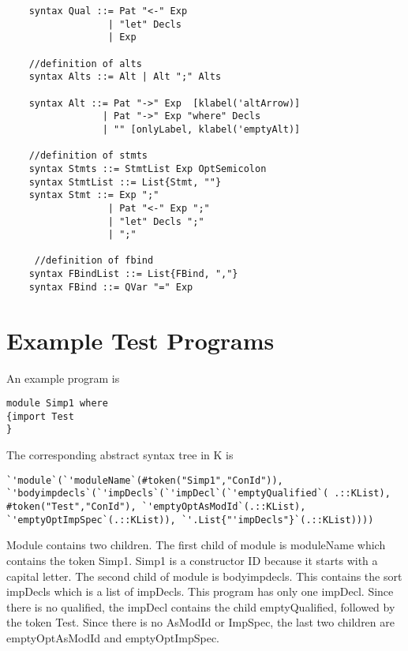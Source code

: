 \begin{lstlisting}
    syntax Qual ::= Pat "<-" Exp
                  | "let" Decls
                  | Exp

    //definition of alts
    syntax Alts ::= Alt | Alt ";" Alts

    syntax Alt ::= Pat "->" Exp  [klabel('altArrow)]
                 | Pat "->" Exp "where" Decls
                 | "" [onlyLabel, klabel('emptyAlt)]

    //definition of stmts
    syntax Stmts ::= StmtList Exp OptSemicolon
    syntax StmtList ::= List{Stmt, ""}
    syntax Stmt ::= Exp ";"
                  | Pat "<-" Exp ";"
                  | "let" Decls ";"
                  | ";"

     //definition of fbind
    syntax FBindList ::= List{FBind, ","}
    syntax FBind ::= QVar "=" Exp
\end{lstlisting}

\section{Example Test Programs}
An example program is
\begin{lstlisting}
module Simp1 where
{import Test
}
\end{lstlisting}

The corresponding abstract syntax tree in K is
\begin{lstlisting}
`'module`(`'moduleName`(#token("Simp1","ConId")), `'bodyimpdecls`(`'impDecls`(`'impDecl`(`'emptyQualified`( .::KList), #token("Test","ConId"), `'emptyOptAsModId`(.::KList), `'emptyOptImpSpec`(.::KList)), `'.List{"'impDecls"}`(.::KList))))
\end{lstlisting}

Module contains two children. The first child of module is moduleName which contains the token Simp1. Simp1 is a constructor ID because it starts with a capital letter. The second child of module is bodyimpdecls. This contains the sort impDecls which is a list of impDecls. This program has only one impDecl. Since there is no qualified, the impDecl contains the child emptyQualified, followed by the token Test. Since there is no AsModId or ImpSpec, the last two children are emptyOptAsModId and emptyOptImpSpec.